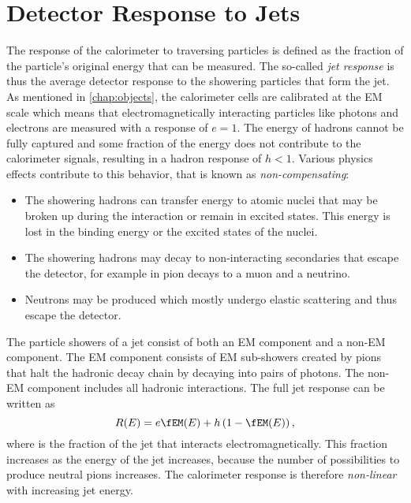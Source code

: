 


\section{Detector Response to Jets}
\label{sec:detector-response}
The response of the calorimeter to traversing particles is defined as the fraction of the particle's original energy that can be measured. The so-called \emph{jet response} is thus the average detector response to the showering particles that form the jet.
As mentioned in \cref{chap:objects}, the calorimeter cells are calibrated at the EM scale which means that electromagnetically interacting particles like photons and electrons are measured with a response of $e = 1$. The energy of hadrons cannot be fully captured and some fraction of the energy does not contribute to the calorimeter signals, resulting in a hadron response of $h < 1$. Various physics effects contribute to this behavior, that is known as \emph{non-compensating}:
\begin{itemize}
    \item The showering hadrons can transfer energy to atomic nuclei that may be broken up during the interaction or remain in excited states. This energy is lost in the binding energy or the excited states of the nuclei.
    \item The showering hadrons may decay to non-interacting secondaries that escape the detector, for example in pion decays to a muon and a neutrino.
    \item Neutrons may be produced which mostly undergo elastic scattering and thus escape the detector.
\end{itemize}

The particle showers of a jet consist of both an EM component and a non-EM component. The EM component consists of EM sub-showers created by pions that halt the hadronic decay chain by decaying into pairs of photons. The non-EM component includes all hadronic interactions.
The full jet response can be written as
\begin{equation}
    R(E) = e\fEM(E) + h\left(1 - \fEM(E)\right),
\end{equation}
where \fEM is the fraction of the jet that interacts electromagnetically. This fraction increases as the energy of the jet increases, because the number of possibilities to produce neutral pions increases. The calorimeter response is therefore \emph{non-linear} with increasing jet energy.

